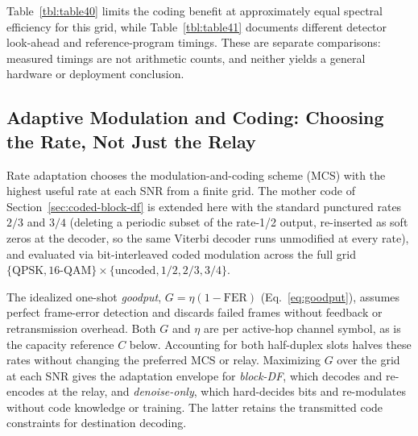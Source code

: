 Table~\ref{tbl:table40} limits the coding benefit at approximately equal spectral efficiency for this grid, while Table~\ref{tbl:table41} documents different detector look-ahead and reference-program timings. These are separate comparisons: measured timings are not arithmetic counts, and neither yields a general hardware or deployment conclusion.

\subsection{Adaptive Modulation and Coding: Choosing the Rate, Not Just the Relay}\label{sec:coded-rate-adaptation}

Rate adaptation chooses the modulation-and-coding scheme (MCS) with the highest useful rate at each SNR from a finite grid. The mother code of Section~\ref{sec:coded-block-df} is extended here with the standard punctured rates $2/3$ and $3/4$ (deleting a periodic subset of the rate-1/2 output, re-inserted as soft zeros at the decoder, so the same Viterbi decoder runs unmodified at every rate), and evaluated via bit-interleaved coded modulation across the full grid $\{\text{QPSK}, \text{16-QAM}\} \times \{\text{uncoded}, 1/2, 2/3, 3/4\}$.

The idealized one-shot \emph{goodput}, $G=\eta(1-\mathrm{FER})$ (Eq.~\ref{eq:goodput}), assumes perfect frame-error detection and discards failed frames without feedback or retransmission overhead. Both $G$ and $\eta$ are per active-hop channel symbol, as is the capacity reference $C$ below. Accounting for both half-duplex slots halves these rates without changing the preferred MCS or relay. Maximizing $G$ over the grid at each SNR gives the adaptation envelope for \emph{block-DF}, which decodes and re-encodes at the relay, and \emph{denoise-only}, which hard-decides bits and re-modulates without code knowledge or training. The latter retains the transmitted code constraints for destination decoding.

